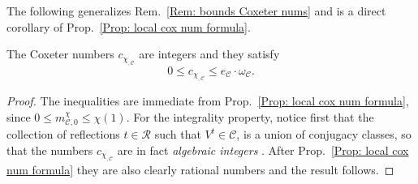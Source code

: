 The following generalizes Rem.~\ref{Rem: bounds Coxeter nums} and is a direct corollary of Prop.~\ref{Prop: local cox num formula}.

\begin{coro}\label{Corol: local cox num are integers andbounds}
The Coxeter numbers $c_{\chi_{,\mathcal{C}}}$ are integers and they satisfy $$ 0\leq c_{\chi_{,\mathcal{C}}}\leq e_{\mathcal{C}}\cdot\omega_{\mathcal{C}}.$$
\end{coro}
\begin{proof}
The inequalities are immediate from Prop.~\ref{Prop: local cox num formula}, since $0\leq m^{\chi}_{\mathcal{C},0}\leq \chi(1)$. For the integrality property, notice first that the collection of reflections $t\in \mathcal{R}$ such that $V^t\in\mathcal{C}$, is a union of conjugacy classes, so that the numbers $c_{\chi_{,\mathcal{C}}}$ are in fact \emph{algebraic integers} \cite[Corol.~1, p.~52]{Serre}. After Prop.~\ref{Prop: local cox num formula} they are also clearly rational numbers and the result follows.
\end{proof}

